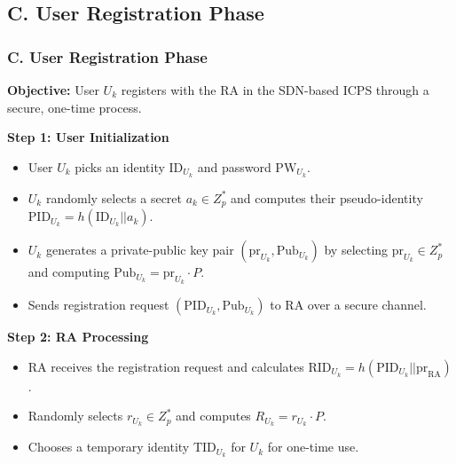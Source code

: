 \documentclass[9pt,handout]{beamer}
\begin{document}
\subsection{C. User Registration Phase}
\begin{frame}
    \frametitle{C. User Registration Phase}
    
    \textbf{Objective:} User \( U_k \) registers with the RA in the SDN-based ICPS through a secure, one-time process.
    
    \textbf{Step 1: User Initialization}
    \begin{itemize}
        \item User \( U_k \) picks an identity \( \text{ID}_{U_k} \) and password \( \text{PW}_{U_k} \).
        \item \( U_k \) randomly selects a secret \( a_k \in Z^*_p \) and computes their pseudo-identity \( \text{PID}_{U_k} = h(\text{ID}_{U_k} || a_k) \).
        \item \( U_k \) generates a private-public key pair \( (\text{pr}_{U_k}, \text{Pub}_{U_k}) \) by selecting \( \text{pr}_{U_k} \in Z^*_p \) and computing \( \text{Pub}_{U_k} = \text{pr}_{U_k} \cdot P \).
        \item Sends registration request \( (\text{PID}_{U_k}, \text{Pub}_{U_k}) \) to RA over a secure channel.
    \end{itemize}
    
    \textbf{Step 2: RA Processing}
    \begin{itemize}
        \item RA receives the registration request and calculates \( \text{RID}_{U_k} = h(\text{PID}_{U_k} || \text{pr}_{\text{RA}}) \).
        \item Randomly selects \( r_{U_k} \in Z^*_p \) and computes \( R_{U_k} = r_{U_k} \cdot P \).
        \item Chooses a temporary identity \( \text{TID}_{U_k} \) for \( U_k \) for one-time use.
    \end{itemize}
\end{frame}
\end{document}
